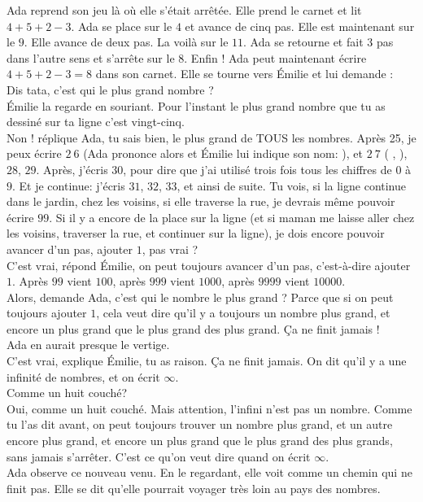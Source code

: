 Ada reprend son jeu là où elle s’était arrêtée. 
Elle prend le carnet et lit $4 + 5 + 2 - 3$. 
Ada se place sur le $4$ et avance de cinq pas. 
Elle est maintenant sur le $9$. 
Elle avance de deux pas. La voilà sur le $11$. 
Ada se retourne et fait $3$ pas dans l’autre sens et s’arrête sur le $8$.
Enfin ! Ada peut maintenant écrire $4 + 5 + 2 - 3 = 8$ dans son carnet.
Elle se tourne vers Émilie et lui demande :\\
\guillemotleft Dis tata, c’est qui le plus grand nombre ? \guillemotright\\
Émilie la regarde en souriant.
\guillemotleft Pour l’instant le plus grand nombre que tu as dessiné sur ta ligne c’est vingt-cinq.\\
\mdash Non ! réplique Ada, tu sais bien, le plus grand de TOUS les nombres. Après 25, je peux écrire $2~6$ (Ada prononce alors  et Émilie lui indique son nom: ), et $2~7$ ( , ), $28$, $29$. Après, j’écris $30$, pour dire que j’ai utilisé trois fois tous les chiffres de $0$ à $9$. Et je continue: j’écris $31$, $32$, $33$, et ainsi de suite. Tu vois, si la ligne continue dans le jardin, chez les voisins, si elle traverse la rue, je devrais même pouvoir écrire $99$. Si il y a encore de la place sur la ligne (et si maman me laisse aller chez les voisins, traverser la rue, et continuer sur la ligne), je dois encore pouvoir avancer d’un pas, ajouter $1$, pas vrai ?\\
\mdash C’est vrai, répond Émilie, on peut toujours avancer d’un pas, c’est-à-dire ajouter $1$. Après $99$ vient $100$, après $999$ vient $1000$, après $9999$ vient $10000$.\\
\mdash Alors, demande Ada, c’est qui le nombre le plus grand ? Parce que si on peut toujours ajouter $1$, cela veut dire qu’il y a toujours un nombre plus grand, et encore un plus grand que le plus grand des plus grand. Ça ne finit jamais ! \guillemotright\\ 
Ada en aurait presque le vertige. \\
\guillemotleft C’est vrai, explique Émilie, tu as raison. Ça ne finit jamais. On dit qu’il y a une infinité de nombres, et on écrit $\infty$.\\
\mdash Comme un huit couché?\\
\mdash Oui, comme un huit couché. Mais attention, l’infini n’est pas un nombre. Comme tu l’as dit avant, on peut toujours trouver un nombre plus grand, et un autre encore plus grand, et encore un plus grand que le plus grand des plus grands, sans jamais s'arrêter. C’est ce qu’on veut dire quand on écrit $\infty$. \guillemotright\\
Ada observe ce nouveau venu. En le regardant, elle voit comme un chemin qui ne finit pas. Elle se dit qu’elle pourrait voyager très loin au pays des nombres.

